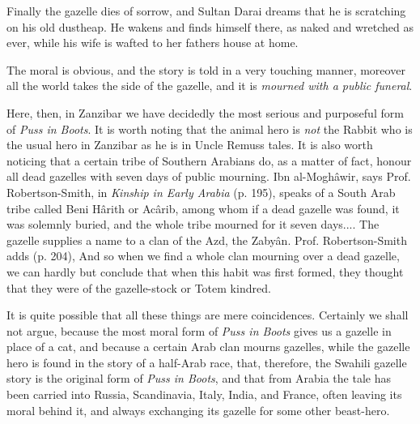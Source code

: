 \documentclass[14pt,a4paper]{memoir}
\begin{document}
{Finally the gazelle dies of sorrow, and Sultan Darai dreams that he is
scratching on his old dustheap. He wakens and finds himself there, as
naked and wretched as ever, while his wife is wafted to her
father\textquotesingle s house at home.

The moral is obvious, and the story is told in a very touching manner,
moreover all the world takes the side of the gazelle, and it is
\emph{mourned with a public funeral}.

Here, then, in Zanzibar we have decidedly the most serious and
purposeful form of \emph{Puss in Boots}. It is worth noting that the
animal hero is \emph{not} the Rabbit who is the usual hero in Zanzibar
as he is in Uncle Remus\textquotesingle s tales. It is also worth
noticing that a certain tribe of Southern Arabians do, as a matter of
fact, honour all dead gazelles with seven days of public mourning.
\textquotesingle Ibn al-Moghâwir,\textquotesingle{} says Prof.
Robertson-Smith, in \emph{Kinship in Early Arabia} (p. 195),
\textquotesingle speaks of a South Arab tribe called Beni Hârith or
Acârib, among whom if a dead gazelle was found, it was solemnly buried,
and the whole tribe mourned for it seven days.... The gazelle supplies a
name to a clan of the Azd, the Zabyân.\textquotesingle{} Prof.
Robertson-Smith adds (p. 204), \textquotesingle And so when we find a
whole clan mourning over a dead gazelle, we can hardly but conclude that
when this habit was first formed, they thought that they were of the
gazelle-stock\textquotesingle{} or Totem kindred.

It is quite possible that all these things are mere coincidences.
Certainly we shall not argue, because the most moral form of \emph{Puss
in Boots} gives us a gazelle in place of a cat, and because a certain
Arab clan mourns gazelles, while the gazelle hero is found in the story
of a half-Arab race, that, therefore, the Swahili gazelle story is the
original form of \emph{Puss in Boots}, and that from Arabia the tale has
been carried into Russia, Scandinavia, Italy, India, and France, often
leaving its moral behind it, and always exchanging its gazelle for some
other beast-hero.

}
\end{document}
